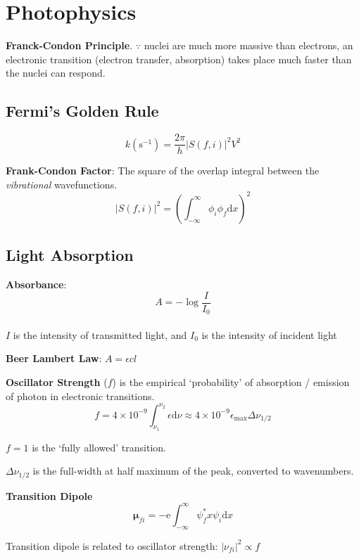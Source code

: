 \section{Photophysics}
\textbf{Franck-Condon Principle}. $\because$ nuclei are much more massive than electrons,
an electronic transition (electron transfer, absorption) takes place much faster than the nuclei can respond.
\subsection*{Fermi's Golden Rule}
$$k(\mathrm{s}^{-1}) = \frac{2\pi}{h}|S(f,i)|^2V^2$$

\textbf{Frank-Condon Factor}: The square of the overlap integral between the \textit{vibrational} wavefunctions.
$$|S(f,i)|^2 = \left( \int^{\infty}_{-\infty}\phi_i\phi_f \mathrm{d}x \right)^2$$

\subsection*{Light Absorption}
\textbf{Absorbance}: $$ A = -\log \frac{I}{I_0}$$ \\
$I$ is the intensity of transmitted light, and $I_0$ is the intensity of incident light

\vspace{\baselineskip}

\textbf{Beer Lambert Law}: $A = \epsilon cl$
\vspace{\baselineskip}

\textbf{Oscillator Strength} ($f$) is the empirical `probability' of absorption / emission of photon in electronic transitions.
\begin{equation*}
  f = 4 \times 10^{-9} \int_{\nu_1}^{\nu_2}\epsilon \mathrm{d}\nu \approx 4 \times 10^{-9} \epsilon_{\mathrm{max}} \Delta \nu_{1/2}
\end{equation*}

$f = 1$ is the `fully allowed' transition.

$\Delta \nu_{1/2}$ is the full-width at half maximum of the peak, converted to wavenumbers.
\vspace{\baselineskip}

\textbf{Transition Dipole}
\begin{equation*}
  \mathbf{\mu}_{fi} = -\mathrm{e} \int_{-\infty}^{\infty}\psi^{*}_{f} x \psi_{i} \mathrm{d}x
\end{equation*}

Transition dipole is related to oscillator strength: $|\nu_{fi}|^2 \propto f$
\vspace{\baselineskip}

